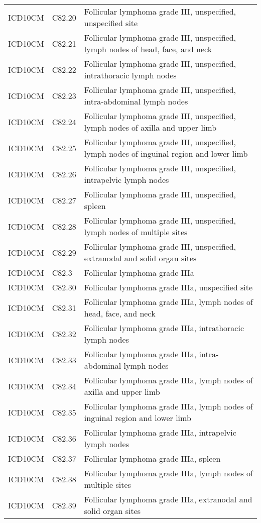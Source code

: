 \begin{table}[ht]
\begin{tabular}{lll}
  ICD10CM & C82.20 & Follicular lymphoma grade III, unspecified, unspecified site \\ 
  ICD10CM & C82.21 & Follicular lymphoma grade III, unspecified, lymph nodes of head, face, and neck \\ 
  ICD10CM & C82.22 & Follicular lymphoma grade III, unspecified, intrathoracic lymph nodes \\ 
  ICD10CM & C82.23 & Follicular lymphoma grade III, unspecified, intra-abdominal lymph nodes \\ 
  ICD10CM & C82.24 & Follicular lymphoma grade III, unspecified, lymph nodes of axilla and upper limb \\ 
  ICD10CM & C82.25 & Follicular lymphoma grade III, unspecified, lymph nodes of inguinal region and lower limb \\ 
  ICD10CM & C82.26 & Follicular lymphoma grade III, unspecified, intrapelvic lymph nodes \\ 
  ICD10CM & C82.27 & Follicular lymphoma grade III, unspecified, spleen \\ 
  ICD10CM & C82.28 & Follicular lymphoma grade III, unspecified, lymph nodes of multiple sites \\ 
  ICD10CM & C82.29 & Follicular lymphoma grade III, unspecified, extranodal and solid organ sites \\ 
  ICD10CM & C82.3 & Follicular lymphoma grade IIIa \\ 
  ICD10CM & C82.30 & Follicular lymphoma grade IIIa, unspecified site \\ 
  ICD10CM & C82.31 & Follicular lymphoma grade IIIa, lymph nodes of head, face, and neck \\ 
  ICD10CM & C82.32 & Follicular lymphoma grade IIIa, intrathoracic lymph nodes \\ 
  ICD10CM & C82.33 & Follicular lymphoma grade IIIa, intra-abdominal lymph nodes \\ 
  ICD10CM & C82.34 & Follicular lymphoma grade IIIa, lymph nodes of axilla and upper limb \\ 
  ICD10CM & C82.35 & Follicular lymphoma grade IIIa, lymph nodes of inguinal region and lower limb \\ 
  ICD10CM & C82.36 & Follicular lymphoma grade IIIa, intrapelvic lymph nodes \\ 
  ICD10CM & C82.37 & Follicular lymphoma grade IIIa, spleen \\ 
  ICD10CM & C82.38 & Follicular lymphoma grade IIIa, lymph nodes of multiple sites \\ 
  ICD10CM & C82.39 & Follicular lymphoma grade IIIa, extranodal and solid organ sites \\ 

\end{tabular}
\end{table}
